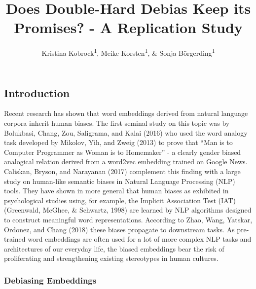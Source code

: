 \documentclass[
  english,
  man,floatsintext]{apa6}
\title{Does Double-Hard Debias Keep its Promises? - A Replication Study}
\author{Kristina Kobrock\textsuperscript{1}, Meike Korsten\textsuperscript{1}, \& Sonja Börgerding\textsuperscript{1}}
\date{}
\affiliation{\vspace{0.5cm}\textsuperscript{1} University of Osnabrück}
\begin{document}
\maketitle

\hypertarget{introduction}{%
\subsection{Introduction}\label{introduction}}

Recent research has shown that word embeddings derived from natural language corpora inherit human biases. The first seminal study on this topic was by Bolukbasi, Chang, Zou, Saligrama, and Kalai (2016) who used the word analogy task developed by Mikolov, Yih, and Zweig (2013) to prove that ``Man is to Computer Programmer as Woman is to Homemaker'' - a clearly gender biased analogical relation derived from a word2vec embedding trained on Google News. Caliskan, Bryson, and Narayanan (2017) complement this finding with a large study on human-like semantic biases in Natural Language Processing (NLP) tools. They have shown in more general that human biases as exhibited in psychological studies using, for example, the Implicit Association Test (IAT) (Greenwald, McGhee, \& Schwartz, 1998) are learned by NLP algorithms designed to construct meaningful word representations. According to Zhao, Wang, Yatskar, Ordonez, and Chang (2018) these biases propagate to downstream tasks. As pre-trained word embeddings are often used for a lot of more complex NLP tasks and architectures of our everyday life, the biased embeddings bear the risk of proliferating and strengthening existing stereotypes in human cultures.

\hypertarget{debiasing-embeddings}{%
\subsubsection{Debiasing Embeddings}\label{debiasing-embeddings}}
\end{document}
